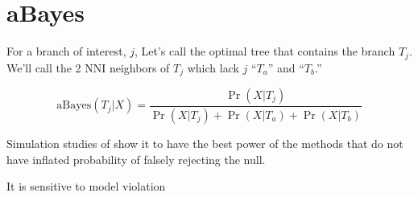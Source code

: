 \documentclass[landscape]{foils}
\begin{document}
\myNewSlide
\section*{aBayes \citet{AnisimovaGDDG2011} }

For a branch of interest, $j$, Let's call the optimal tree that contains the branch $T_j$.
We'll call the 2 NNI neighbors of $T_j$  which lack $j$ ``$T_a$'' and ``$T_b$.''

$$\mbox{aBayes}(T_j|X) = \frac{\Pr(X|T_j)}{\Pr(X|T_j) + \Pr(X|T_a) + \Pr(X|T_b)}$$

Simulation studies of \citet{AnisimovaGDDG2011} show it to have the best power of the methods that do not have inflated probability of falsely rejecting the null.

It is sensitive to model violation



\myNewSlide
\normalsize

\end{document}
